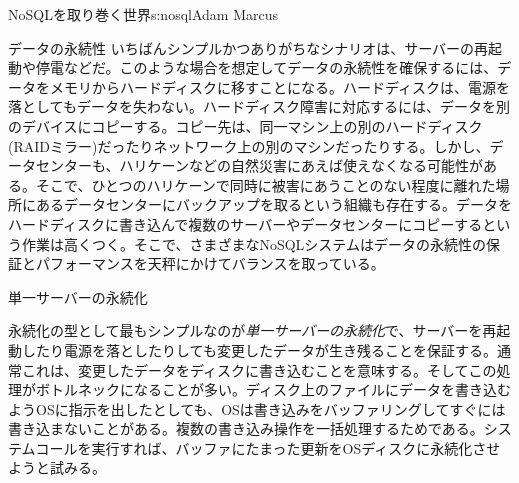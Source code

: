 \begin{aosachapter}{NoSQLを取り巻く世界}{s:nosql}{Adam Marcus}
\begin{aosasect1}{データの永続性}
いちばんシンプルかつありがちなシナリオは、サーバーの再起動や停電などだ。このような場合を想定してデータの永続性を確保するには、データをメモリからハードディスクに移すことになる。ハードディスクは、電源を落としてもデータを失わない。ハードディスク障害に対応するには、データを別のデバイスにコピーする。コピー先は、同一マシン上の別のハードディスク(RAIDミラー)だったりネットワーク上の別のマシンだったりする。しかし、データセンターも、ハリケーンなどの自然災害にあえば使えなくなる可能性がある。そこで、ひとつのハリケーンで同時に被害にあうことのない程度に離れた場所にあるデータセンターにバックアップを取るという組織も存在する。データをハードディスクに書き込んで複数のサーバーやデータセンターにコピーするという作業は高くつく。そこで、さまざまなNoSQLシステムはデータの永続性の保証とパフォーマンスを天秤にかけてバランスを取っている。

\begin{aosasect2}{単一サーバーの永続化}

永続化の型として最もシンプルなのが\emph{単一サーバーの永続化}で、サーバーを再起動したり電源を落としたりしても変更したデータが生き残ることを保証する。通常これは、変更したデータをディスクに書き込むことを意味する。そしてこの処理がボトルネックになることが多い。ディスク上のファイルにデータを書き込むようOSに指示を出したとしても、OSは書き込みをバッファリングしてすぐには書き込まないことがある。複数の書き込み操作を一括処理するためである。システムコールを実行すれば、バッファにたまった更新をOSディスクに永続化させようと試みる。


\end{aosasect2}
\end{aosasect1}
\end{aosachapter}
